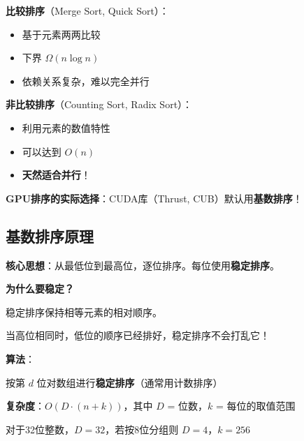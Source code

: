 \documentclass[12pt, a4paper]{ctexart}
\begin{document}
\begin{blackboard}

\textbf{比较排序}（Merge Sort, Quick Sort）：
\begin{itemize}
    \item 基于元素两两比较
    \item 下界 $\Omega(n \log n)$
    \item 依赖关系复杂，难以完全并行
\end{itemize}

\textbf{非比较排序}（Counting Sort, Radix Sort）：
\begin{itemize}
    \item 利用元素的数值特性
    \item 可以达到 $O(n)$
    \item \textbf{天然适合并行}！
\end{itemize}

\textbf{GPU排序的实际选择}：CUDA库（Thrust, CUB）默认用\textbf{基数排序}！

\end{blackboard}

\subsection{基数排序原理}

\begin{blackboard}

\textbf{核心思想}：从最低位到最高位，逐位排序。每位使用\textbf{稳定排序}。

\textbf{为什么要稳定？}

稳定排序保持相等元素的相对顺序。

当高位相同时，低位的顺序已经排好，稳定排序不会打乱它！

\textbf{算法}：
\begin{algorithmic}[1]
    \STATE 按第 $d$ 位对数组进行\textbf{稳定排序}（通常用计数排序）
\ENDFOR
\end{algorithmic}

\textbf{复杂度}：$O(D \cdot (n + k))$，其中 $D$ = 位数，$k$ = 每位的取值范围

对于32位整数，$D = 32$，若按8位分组则 $D = 4$，$k = 256$

\end{blackboard}
\end{document}
